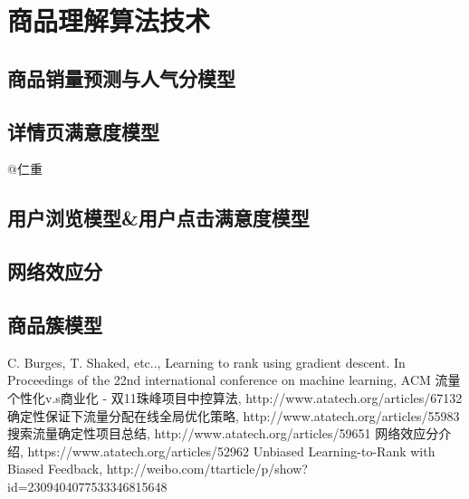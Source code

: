 
\chapter{ 商品理解算法技术 }
\thispagestyle{empty}

\setlength{\fboxrule}{0pt}\setlength{\fboxsep}{0cm}
\noindent\shadowbox{
\begin{tcolorbox}[arc=0mm,colback=lightblue,colframe=darkblue,title=学习目标与要求]

\end{tcolorbox}}
\setlength{\fboxrule}{1pt}\setlength{\fboxsep}{4pt} 

\section{商品销量预测与人气分模型 }

\section{详情页满意度模型} 
@仁重

\section{用户浏览模型\&用户点击满意度模型}  

\section{网络效应分}

\section{商品簇模型} 


\begin{thebibliography}{99}
 C. Burges, T. Shaked, etc.., Learning to rank 
using gradient descent. In Proceedings of the 22nd international 
conference on machine learning, ACM
 流量个性化v.s商业化 - 双11珠峰项目中控算法, http://www.atatech.org/articles/67132
 确定性保证下流量分配在线全局优化策略, http://www.atatech.org/articles/55983
 搜索流量确定性项目总结, http://www.atatech.org/articles/59651
 网络效应分介绍, https://www.atatech.org/articles/52962
 Unbiased Learning-to-Rank with Biased Feedback, http://weibo.com/ttarticle/p/show?id=2309404077533346815648
\end{thebibliography}

 
